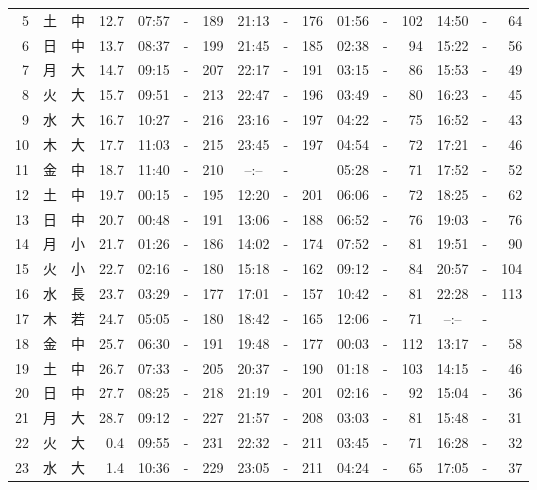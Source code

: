 \documentclass[12pt.a4j]{jsarticle}
\begin{document}
\begin{center}
\begin{table}[ht]
\begin{tabular}{|rc|cr|ccrccr|ccrccr|}
 5 & 土 & 中 & 12.7 &  07:57 &-& 189  &  21:13 &-& 176  &   01:56 &-& 102  &   14:50 &-&  64  \\
 6 & 日 & 中 & 13.7 &  08:37 &-& 199  &  21:45 &-& 185  &   02:38 &-&  94  &   15:22 &-&  56  \\
 7 & 月 & 大 & 14.7 &  09:15 &-& 207  &  22:17 &-& 191  &   03:15 &-&  86  &   15:53 &-&  49  \\
 8 & 火 & 大 & 15.7 &  09:51 &-& 213  &  22:47 &-& 196  &   03:49 &-&  80  &   16:23 &-&  45  \\
 9 & 水 & 大 & 16.7 &  10:27 &-& 216  &  23:16 &-& 197  &   04:22 &-&  75  &   16:52 &-&  43  \\
10 & 木 & 大 & 17.7 &  11:03 &-& 215  &  23:45 &-& 197  &   04:54 &-&  72  &   17:21 &-&  46  \\
11 & 金 & 中 & 18.7 &  11:40 &-& 210  &  --:-- &-&     &   05:28 &-&  71  &   17:52 &-&  52  \\
12 & 土 & 中 & 19.7 &  00:15 &-& 195  &  12:20 &-& 201  &   06:06 &-&  72  &   18:25 &-&  62  \\
13 & 日 & 中 & 20.7 &  00:48 &-& 191  &  13:06 &-& 188  &   06:52 &-&  76  &   19:03 &-&  76  \\
14 & 月 & 小 & 21.7 &  01:26 &-& 186  &  14:02 &-& 174  &   07:52 &-&  81  &   19:51 &-&  90  \\
15 & 火 & 小 & 22.7 &  02:16 &-& 180  &  15:18 &-& 162  &   09:12 &-&  84  &   20:57 &-& 104  \\
16 & 水 & 長 & 23.7 &  03:29 &-& 177  &  17:01 &-& 157  &   10:42 &-&  81  &   22:28 &-& 113  \\
17 & 木 & 若 & 24.7 &  05:05 &-& 180  &  18:42 &-& 165  &   12:06 &-&  71  &   --:-- &-&     \\
18 & 金 & 中 & 25.7 &  06:30 &-& 191  &  19:48 &-& 177  &   00:03 &-& 112  &   13:17 &-&  58  \\
19 & 土 & 中 & 26.7 &  07:33 &-& 205  &  20:37 &-& 190  &   01:18 &-& 103  &   14:15 &-&  46  \\
20 & 日 & 中 & 27.7 &  08:25 &-& 218  &  21:19 &-& 201  &   02:16 &-&  92  &   15:04 &-&  36  \\
21 & 月 & 大 & 28.7 &  09:12 &-& 227  &  21:57 &-& 208  &   03:03 &-&  81  &   15:48 &-&  31  \\
22 & 火 & 大 &  0.4 &  09:55 &-& 231  &  22:32 &-& 211  &   03:45 &-&  71  &   16:28 &-&  32  \\
23 & 水 & 大 &  1.4 &  10:36 &-& 229  &  23:05 &-& 211  &   04:24 &-&  65  &   17:05 &-&  37  \\

\end{tabular}
\end{table}
\end{center}
\end{document}
